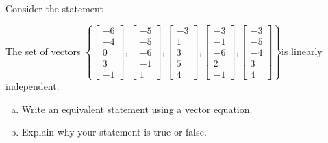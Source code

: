
\begin{exerciseStatement}


Consider the statement 
\begin{center}\begin{minipage}{0.8\textwidth}
 The set of vectors \( \left\{ \left[\begin{array}{c}
-6 \\
-4 \\
0 \\
3 \\
-1
\end{array}\right] , \left[\begin{array}{c}
-5 \\
-5 \\
-6 \\
-1 \\
1
\end{array}\right] , \left[\begin{array}{c}
-3 \\
1 \\
3 \\
5 \\
4
\end{array}\right] , \left[\begin{array}{c}
-3 \\
-1 \\
-6 \\
2 \\
-1
\end{array}\right] , \left[\begin{array}{c}
-3 \\
-5 \\
-4 \\
3 \\
4
\end{array}\right] \right\} \)is linearly independent.
\end{minipage}\end{center}
    


\begin{enumerate}[(a)]
\item  Write an equivalent statement using a vector equation.
\item  Explain why your statement is true or false.
\end{enumerate}
    
\end{exerciseStatement}
    
